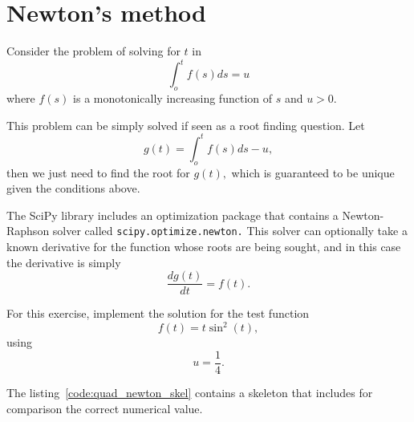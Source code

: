 
\section{Newton's method}

Consider the problem of solving for $t$ in\begin{equation}
\int_{o}^{t}f(s)ds=u\end{equation}
 where $f(s)$ is a monotonically increasing function of $s$ and
$u>0$.

This problem can be simply solved if seen as a root finding question.
Let\begin{equation}
g(t)=\int_{o}^{t}f(s)ds-u,\end{equation}
then we just need to find the root for $g(t),$ which is guaranteed
to be unique given the conditions above. 

The SciPy library includes an optimization package that contains a
Newton-Raphson solver called \texttt{scipy.optimize.newton.} This
solver can optionally take a known derivative for the function whose
roots are being sought, and in this case the derivative is simply
\begin{equation}
\frac{dg(t)}{dt}=f(t).\end{equation}


For this exercise, implement the solution for the test function\[
f(t)=t\sin^{2}(t),\]
 using \[
u=\frac{1}{4}.\]


The listing~\ref{code:quad_newton_skel} contains a skeleton that
includes for comparison the correct numerical value.




